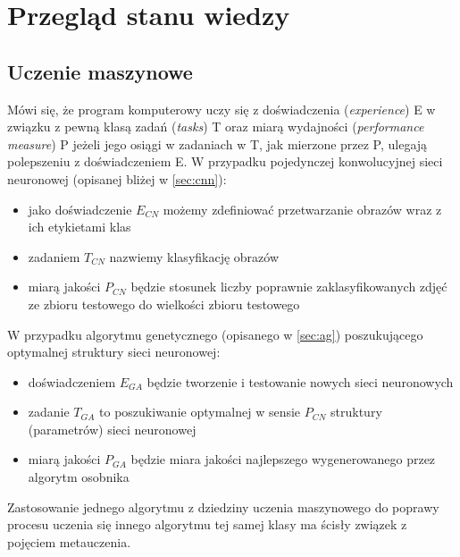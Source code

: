 \chapter{Przegląd stanu wiedzy}\label{chap:teoria}
\section{Uczenie maszynowe}\label{machine_learning}
Mówi się, że program komputerowy uczy się z doświadczenia (\textit{experience}) E w związku z pewną klasą zadań (\textit{tasks}) T oraz miarą wydajności (\textit{performance measure}) P jeżeli jego osiągi w zadaniach w T, jak mierzone przez P, ulegają polepszeniu z doświadczeniem E. \cite{mitchell1997machine}
W przypadku pojedynczej konwolucyjnej sieci neuronowej (opisanej bliżej w \ref{sec:cnn}):
\begin{itemize}
	\item jako doświadczenie $E_{CN}$ możemy zdefiniować przetwarzanie obrazów wraz z ich etykietami klas
	\item zadaniem $T_{CN}$ nazwiemy klasyfikację obrazów
	\item miarą jakości $P_{CN}$ będzie stosunek liczby poprawnie zaklasyfikowanych zdjęć ze zbioru testowego do wielkości zbioru testowego
\end{itemize}
W przypadku algorytmu genetycznego (opisanego w \ref{sec:ag}) poszukującego optymalnej struktury sieci neuronowej:
\begin{itemize}
	\item doświadczeniem $E_{GA}$ będzie tworzenie i testowanie nowych sieci neuronowych
	\item zadanie $T_{GA}$ to poszukiwanie optymalnej w sensie $P_{CN}$ struktury (parametrów) sieci neuronowej
	\item miarą jakości $P_{GA}$ będzie miara jakości najlepszego wygenerowanego przez algorytm osobnika
\end{itemize}
Zastosowanie jednego algorytmu z dziedziny uczenia maszynowego do poprawy procesu uczenia się innego algorytmu tej samej klasy ma ścisły związek z pojęciem metauczenia.
